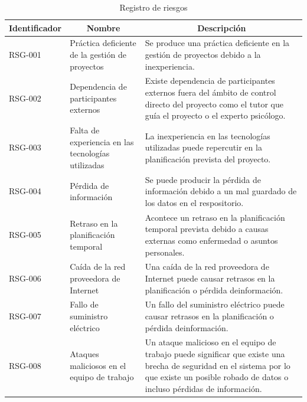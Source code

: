\begin{table}[htpb]
\centering
\begin{tabularx}{\textwidth}{|l|X|X|}
\hline
\multicolumn{1}{|c|}{Identificador} & \multicolumn{1}{c|}{Nombre}                        & \multicolumn{1}{c|}{Descripción}                                                                                                                                                              \\ \hline
RSG-001                             & Práctica deficiente de la gestión de proyectos     & Se produce una práctica deficiente en la gestión de proyectos debido a la inexperiencia.                                                                                                      \\ \hline
RSG-002                             & Dependencia de participantes externos              & Existe dependencia de participantes externos fuera del ámbito de control directo del proyecto como el tutor que guía el proyecto o el experto psicólogo.                                      \\ \hline
RSG-003                             & Falta de experiencia en las tecnologías utilizadas & La inexperiencia en las tecnologías utilizadas puede repercutir en la planificación prevista del proyecto.                                                                                    \\ \hline
RSG-004                             & Pérdida de información                             & Se puede producir la pérdida de información debido a un mal guardado de los datos en el respositorio.                                                                                         \\ \hline
RSG-005                             & Retraso en la planificación temporal               & Acontece un retraso en la planificación temporal prevista debido a causas externas como enfermedad o asuntos personales.                                                                      \\ \hline
RSG-006                             & Caída de la red proveedora de Internet             & Una caída de la red proveedora de Internet puede causar retrasos en la planificación o pérdida deinformación.                                                                                 \\ \hline
RSG-007                             & Fallo de suministro eléctrico                      & Un fallo del suministro eléctrico  puede causar retrasos en la planificación o pérdida deinformación.                                                                                         \\ \hline
RSG-008                             & Ataques maliciosos en el equipo de trabajo         & Un ataque malicioso en el equipo de trabajo puede significar que existe una brecha de seguridad en el sistema por lo que existe un posible robado de datos o incluso pérdidas de información. \\ \hline
\end{tabularx}
\caption{Registro de riesgos}
\label{tab_reg_riesgos}
\end{table}

